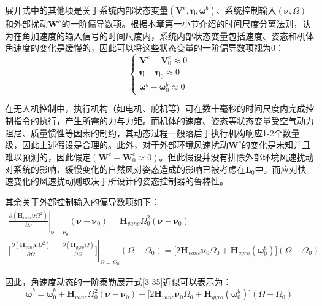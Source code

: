 展开式中的其他项是关于系统内部状态变量$(\boldsymbol{V}^e,\boldsymbol{\eta},\boldsymbol{\omega}^b)$、系统控制输入$(\boldsymbol{\nu},\Omega)$和外部扰动$\boldsymbol{W^e}$的一阶偏导数项。根据本章第一小节介绍的时间尺度分离法则，认为在角加速度的输入信号的时间尺度内，系统内部状态变量包括速度、姿态和机体角速度的变化是缓慢的，因此可以将这些状态变量的一阶偏导数项视为0：
\begin{equation}
    \begin{cases}
        \boldsymbol{V}^e-\boldsymbol{V}_0^e\approx0 \\
        \boldsymbol{\eta}-\boldsymbol{\eta}_0\approx0 \\
        \boldsymbol{\omega}^b-\boldsymbol{\omega}_0^b\approx0
    \end{cases}
    \label{3-37}
\end{equation}

在无人机控制中，执行机构（如电机、舵机等）可在数十毫秒的时间尺度内完成控制指令的执行，产生所需的力与力矩。而机体的速度、姿态等状态变量受空气动力阻尼、质量惯性等因素的制约，其动态过程一般落后于执行机构响应1-2个数量级，因此上述假设是合理的。此外，对于外部环境风速扰动$\boldsymbol{W}^e$的变化是未知并且难以预测的，因此假定$(\boldsymbol{W}^e-\boldsymbol{W}_0^e\approx0)$。但此假设并没有排除外部环境风速扰动对系统的影响，缓慢变化的自然风对姿态造成的影响已被考虑在$\boldsymbol{L}_0$中。而应对快速变化的风速扰动则取决于所设计的姿态控制器的鲁棒性。

其余关于外部控制输入的偏导数项如下：
\begin{equation}
    \begin{gathered}
    \left.\frac{\partial(\boldsymbol{H}_{vane}\boldsymbol{\nu}\Omega^2)}{\partial\boldsymbol{\nu}}\right|_{\boldsymbol{\nu}=\boldsymbol{\nu}_0}(\boldsymbol{\nu}-\boldsymbol{\nu}_0)=\boldsymbol{H}_{vane}\Omega_0^2(\boldsymbol{\nu}-\boldsymbol{\nu}_0) \\
    \left.\bigg[\frac{\partial(\boldsymbol{H}_{vane}\boldsymbol{\nu}\Omega^2)}{\partial\Omega}+\frac{\partial(\boldsymbol{H}_{gyro}\Omega)}{\partial\Omega}\bigg]\right|_{\Omega=\Omega_0}(\Omega-\Omega_0)=\big[2\boldsymbol{H}_{vane}\boldsymbol{\nu}_0\Omega_0+\boldsymbol{H}_{gyro}(\boldsymbol{\omega}_0^b)\big](\Omega-\Omega_0)
    \end{gathered}
    \label{3-38}
\end{equation}

因此，角速度动态的一阶泰勒展开式\eqref{3-35}近似可以表示为：
\begin{equation}
    \boldsymbol{\dot{\omega}}^b=\boldsymbol{\dot{\omega}}_0^b+\boldsymbol{H}_{vane}\Omega_0^2(\boldsymbol{\nu}-\boldsymbol{\nu}_0)+\big[2\boldsymbol{H}_{vane}\boldsymbol{\nu}_0\Omega_0+\boldsymbol{H}_{gyro}(\boldsymbol{\omega}_0^b)\big](\Omega-\Omega_0)
    \label{3-39}
\end{equation}

